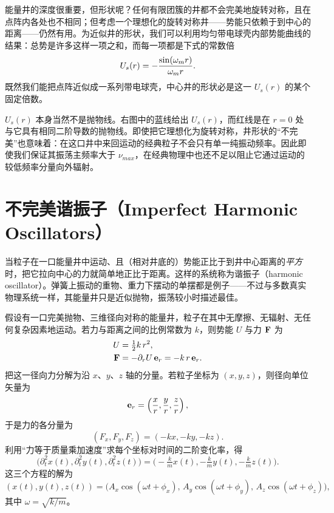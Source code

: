能量井的深度很重要，但形状呢？任何有限团簇的井都不会完美地旋转对称，且在点阵内各处也不相同；但考虑一个理想化的旋转对称井——势能只依赖于到中心的距离——仍然有用。为近似井的形状，我们可以利用均匀带电球壳内部势能曲线的结果：总势是许多这样一项之和，而每一项都是下式的常数倍
\begin{equation}
U_{s}(r)=-\frac{\sin(\omega_m r)}{\omega_m r}.
\end{equation}
既然我们能把点阵近似成一系列带电球壳，中心井的形状必是这一 $U_{s}(r)$ 的某个固定倍数。

$U_{s}(r)$ 本身当然不是抛物线。右图中的蓝线给出 $U_{s}(r)$，而红线是在 $r=0$ 处与它具有相同二阶导数的抛物线。即使把它理想化为旋转对称，井形状的“不完美”也意味着：在这口井中来回运动的经典粒子不会只有单一纯振动频率。因此即使我们保证其振荡主频率大于 $\nu_{max}$，在经典物理中也还不足以阻止它通过运动的较低频率分量向外辐射。

\section{不完美谐振子（Imperfect Harmonic Oscillators）}

当粒子在一口能量井中运动、且（相对井底的）势能正比于到井中心距离的\emph{平方}时，把它拉向中心的力就简单地正比于距离。这样的系统称为谐振子（harmonic oscillator）。弹簧上振动的重物、重力下摆动的单摆都是例子——不过与多数真实物理系统一样，其能量井只是近似抛物，振荡较小时描述最佳。

假设有一口完美抛物、三维径向对称的能量井，粒子在其中无摩擦、无辐射、无任何复杂因素地运动。若力与距离之间的比例常数为 $k$，则势能 $U$ 与力 $\mathbf{F}$ 为
\begin{align}
U&=\tfrac{1}{2} k\,r^{2},\\
\mathbf{F}&=-\partial_{r}U\,\mathbf{e}_{r}=-k\,r\,\mathbf{e}_{r}.
\end{align}
把这一径向力分解为沿 $x$、$y$、$z$ 轴的分量。若粒子坐标为 $(x,y,z)$，则径向单位矢量为
\begin{equation}
\mathbf{e}_{r}=\left(\frac{x}{r},\frac{y}{r},\frac{z}{r}\right),
\end{equation}
于是力的各分量为
\begin{equation}
(F_{x},F_{y},F_{z})=(-kx,-ky,-kz).
\end{equation}
利用“力等于质量乘加速度”求每个坐标对时间的二阶变化率，得
\begin{equation}
\bigl(\partial_{t}^{2}x(t),\partial_{t}^{2}y(t),\partial_{t}^{2}z(t)\bigr)
=\bigl(-\tfrac{k}{m}x(t),-\tfrac{k}{m}y(t),-\tfrac{k}{m}z(t)\bigr).
\end{equation}
这三个方程的解为
\begin{equation}
(x(t),y(t),z(t))=
\bigl(A_{x}\cos(\omega t+\phi_{x}),\,
A_{y}\cos(\omega t+\phi_{y}),\,
A_{z}\cos(\omega t+\phi_{z})\bigr),
\end{equation}
其中 $\omega=\sqrt{k/m}$。

